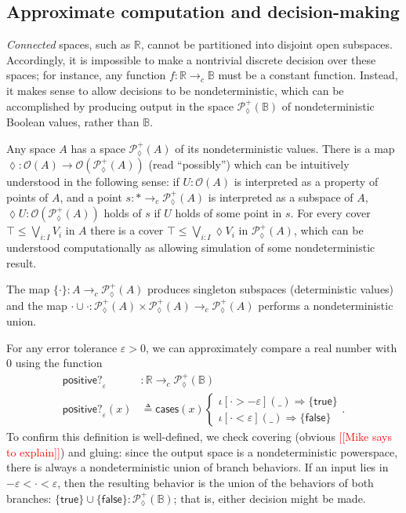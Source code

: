 \documentclass[conference]{IEEEtran}
\newcommand{\PLower}{\mathcal{P}_\lozenge}
\newcommand{\cto}{\to_c}
\newcommand{\R}{\mathbb{R}}
\newcommand{\One}{\ast}
\newcommand{\Open}[1]{\mathcal{O}({#1})}
\newcommand{\bool}{\mathbb{B}}
\newcommand{\wildcard}{\_}
\newcommand{\oinclf}[1]{\iota[{#1}]}
\newcommand{\oincl}[2]{\oinclf{#1} \left({#2}\right)}
\newcommand{\Branch}{\Rightarrow}
\newcommand{\note}[1]{\textcolor{red}{[[{#1}]]}}
\begin{document}
\subsection{Approximate computation and decision-making}
\label{s:ex:approx}

\emph{Connected} spaces, such as $\R$, cannot be partitioned into disjoint open subspaces. Accordingly, it is impossible to make a nontrivial discrete decision over these spaces; for instance, any function $f : \R \cto \bool$ must be a constant function. Instead, it makes sense to allow decisions to be nondeterministic, which can be accomplished by producing output in the space $\PLower^+(\bool)$ of nondeterministic Boolean values, rather than $\bool$.

Any space $A$ has a space $\PLower^+(A)$ of its nondeterministic values. There is a map $\lozenge : \Open{A} \to \Open{\PLower^+(A)}$ (read ``possibly'') which can be intuitively understood in the following sense: if $U : \Open{A}$ is interpreted as a property of points of $A$, and a point $s : \One \cto \PLower^+(A)$ is interpreted as a subspace of $A$, $\lozenge U : \Open{\PLower^+(A)}$ holds of $s$ if $U$ holds of some point in $s$. For every cover $\top \le \bigvee_{i : I} V_i$ in $A$ there is a cover $\top \le \bigvee_{i : I} \lozenge V_i$ in $\PLower^+(A)$, which can be understood computationally as allowing simulation of some nondeterministic result.

The map $\{ \cdot \} : A \cto \PLower^+(A)$ produces singleton subspaces (deterministic values) and the map $\cdot \cup \cdot : \PLower^+(A) \times \PLower^+(A) \cto \PLower^+(A)$ performs a nondeterministic union.

For any error tolerance $\varepsilon > 0$, we can approximately compare a real number with 0 using the function
\begin{align*}
\mathsf{positive?}_\varepsilon &: \R \cto \PLower^+(\bool)
\\ \mathsf{positive?}_\varepsilon(x) &\triangleq \mathsf{cases}(x)
\begin{cases}
\oincl{\cdot > - \varepsilon}{\wildcard} \Branch \{ \mathsf{true} \}
\\ \oincl{\cdot < \varepsilon}{\wildcard} \Branch \{ \mathsf{false} \}
\end{cases}.
\end{align*}
To confirm this definition is well-defined, we check covering (obvious \note{Mike says to explain}) and gluing: since the output space is a nondeterministic powerspace, there is always a nondeterministic union of branch behaviors. If an input lies in $- \varepsilon < \cdot < \varepsilon$, then the resulting behavior is the union of the behaviors of both branches: $\{ \mathsf{true} \} \cup \{ \mathsf{false} \} : \PLower^+(\bool)$; that is, either decision might be made.
\end{document}
